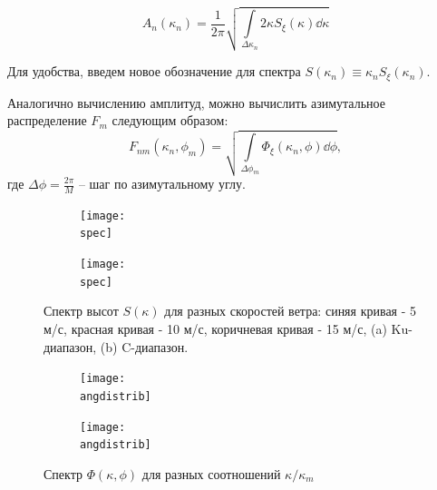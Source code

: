 \begin{equation}
    \label{eq:Amplitude}
    A_n(\kappa_n) = \frac{1}{2 \pi} \sqrt{\int\limits_{\Delta \kappa_n} 2
        \kappa S_\xi(\kappa)
    \dd \kappa}
\end{equation}


Для удобства, введем новое обозначение для спектра
$S(\kappa_n)\equiv \kappa_n S_\xi (\kappa_n)$.

Аналогично вычислению амплитуд, можно вычислить азимутальное распределение $F_m$  следующим образом:
\begin{equation}
    F_{nm}(\kappa_n,\phi_m) = \sqrt{\int\limits_{\Delta \phi_m}
    \Phi_{\xi}(\kappa_n,\phi) \dd \phi},
\end{equation}
где $\Delta \phi = \frac{2\pi}{M}$ -- шаг по азимутальному углу.

\begin{figure}[ht]
    \def\spec{fig/water/spectrum}
    \begin{subfigure}{0.5\linewidth}
        \centering
        \texttt{[image: \\spec]}
        \caption{}
    \end{subfigure}
    \begin{subfigure}{0.5\linewidth}
        \centering
        \texttt{[image: \\spec]}
        \caption{}
    \end{subfigure}
    \caption{Спектр высот $S(\kappa)$ для разных скоростей ветра: синяя кривая
    - 5 м/с, красная кривая - 10 м/с, коричневая кривая - 15 м/с, (a)
Ku-диапазон, (b) C-диапазон.}
    \label{fig:spectrum_heights}
\end{figure}

\begin{figure}[ht]
    \def\angdistrib{fig/water/angles_distribution}
    \begin{subfigure}{0.5\linewidth}
        \centering
        \texttt{[image: \\angdistrib]}
        \caption{}
    \end{subfigure}
    \begin{subfigure}{0.5\linewidth}
        \centering
        \texttt{[image: \\angdistrib]}
        \caption{}
    \end{subfigure}
    \caption{Спектр $\Phi(\kappa, \phi)$ для разных соотношений  $\kappa /
    \kappa_m$}
    \label{fig:angles_distrib}
\end{figure}


